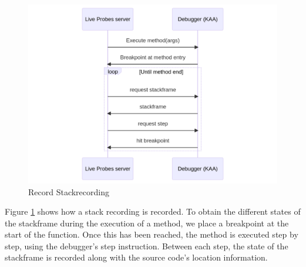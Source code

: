 \documentclass[english,submission]{programming}
\begin{document}
\begin{figure}[h]
  \centering
  \includegraphics[width=0.8\linewidth]{img/uml_sequence_record.png}
  \caption{Record Stackrecording}
  \label{fig:stack-recording-impl}
\end{figure}

Figure \ref{fig:stack-recording-impl} shows how a stack recording is recorded.
To obtain the different states of the stackframe during the execution of a method, we place a breakpoint at the start of the function.
Once this has been reached, the method is executed step by step, using the debugger's step instruction.
Between each step, the state of the stackframe is recorded along with the source code's location information.
\end{document}
